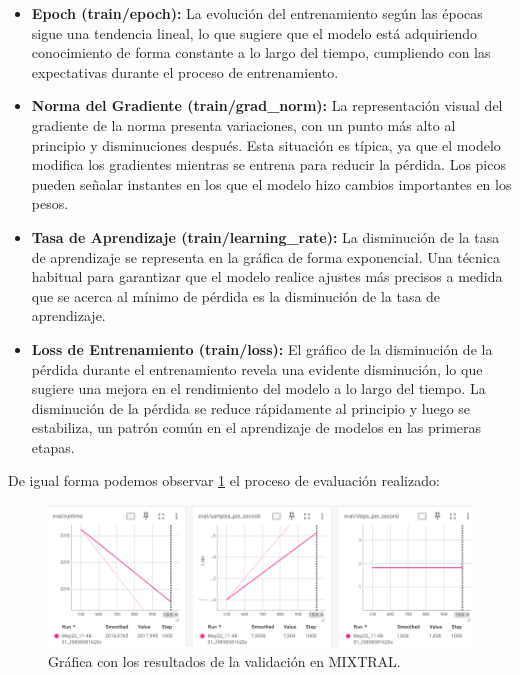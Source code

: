 \begin{itemize}
    \item \textbf{Epoch (train/epoch):} La evolución del entrenamiento según las épocas sigue una tendencia lineal, lo que sugiere que el modelo está adquiriendo conocimiento de forma constante a lo largo del tiempo, cumpliendo con las expectativas durante el proceso de entrenamiento.
    \item \textbf{Norma del Gradiente (train/grad\_norm):} La representación visual del gradiente de la norma presenta variaciones, con un punto más alto al principio y disminuciones después. Esta situación es típica, ya que el modelo modifica los gradientes mientras se entrena para reducir la pérdida. Los picos pueden señalar instantes en los que el modelo hizo cambios importantes en los pesos.
    \item \textbf{Tasa de Aprendizaje (train/learning\_rate):} La disminución de la tasa de aprendizaje se representa en la gráfica de forma exponencial. Una técnica habitual para garantizar que el modelo realice ajustes más precisos a medida que se acerca al mínimo de pérdida es la disminución de la tasa de aprendizaje.
    \item \textbf{Loss de Entrenamiento (train/loss):} El gráfico de la disminución de la pérdida durante el entrenamiento revela una evidente disminución, lo que sugiere una mejora en el rendimiento del modelo a lo largo del tiempo. La disminución de la pérdida se reduce rápidamente al principio y luego se estabiliza, un patrón común en el aprendizaje de modelos en las primeras etapas.
\end{itemize}

\bigskip %

De igual forma podemos observar \ref{fig:5_MIXTRAL_Grafico_Val} el proceso de evaluación realizado:

\bigskip %

\begin{figure}[htbp!]
  \centering
  \includegraphics[width=\textwidth,keepaspectratio]{imaxes/5_MIXTRAL_Grafico_Val.png}
  \caption{Gráfica con los resultados de la validación en MIXTRAL.}
  \label{fig:5_MIXTRAL_Grafico_Val}
\end{figure}

